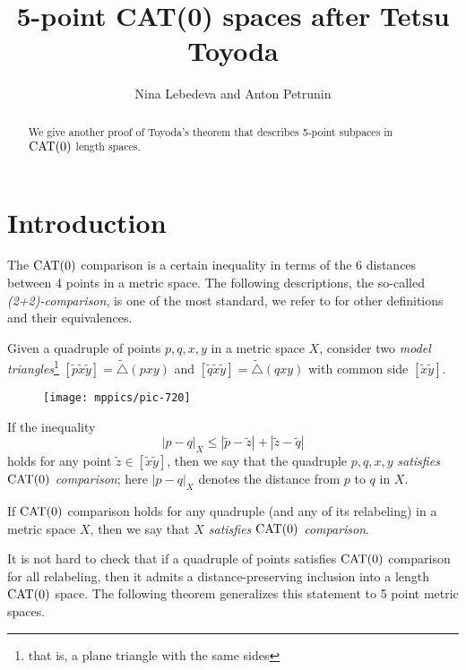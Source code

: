 \documentclass{article}
\begin{document}


\title{5-point CAT(0) spaces after Tetsu Toyoda}
\author{Nina Lebedeva and Anton Petrunin}
\date{}
\maketitle
\begin{abstract}
We give another proof of Toyoda's theorem that describes 5-point subpaces in $\mathrm{CAT}(0)$ length spaces.
\end{abstract}


\section{Introduction}

The $\mathrm{CAT}(0)$ comparison is a certain inequality in terms of the 6 distances between 4 points in a metric space.
The following descriptions, the so-called \emph{(2+2)-comparison}, is one of the most standard,
we refer to \cite{alexander-kapovitch-petrunin} for other definitions and their equivalences.

Given a quadruple of points $p,q,x,y$ in a metric space $X$,
consider two \emph{model triangles}\footnote{that is, a plane triangle with the same sides}
$[\tilde p\tilde x\tilde y]=\tilde\triangle(pxy)$ 
and 
$[\tilde q\tilde x\tilde y]=\tilde\triangle(qxy)$ with common side $[\tilde x\tilde y]$.

\begin{wrapfigure}{r}{25mm}
\vskip-4mm
\centering
\texttt{[image: mppics/pic-720]}
\end{wrapfigure}

If the inequality
\[|p-q|_X\le |\tilde p-\tilde z|+|\tilde z-\tilde q|\]
holds for any point $\tilde z\in [\tilde x\tilde y]$, then we say that 
the quadruple $p,q,x,y$ \emph{satisfies $\mathrm{CAT}(0)$ comparison};
here $|p-q|_X$ denotes the distance from $p$ to $q$ in $X$.

If $\mathrm{CAT}(0)$ comparison holds for any quadruple (and any of its relabeling) in a metric space $X$,
then we say that \emph{$X$ satisfies $\mathrm{CAT}(0)$ comparison}.


It is not hard to check that if a quadruple of points satisfies $\mathrm{CAT}(0)$ comparison for all relabeling,
then it admits a distance-preserving inclusion into a length $\mathrm{CAT}(0)$ space.
The following theorem generalizes this statement to 5 point metric spaces.
\end{document}
